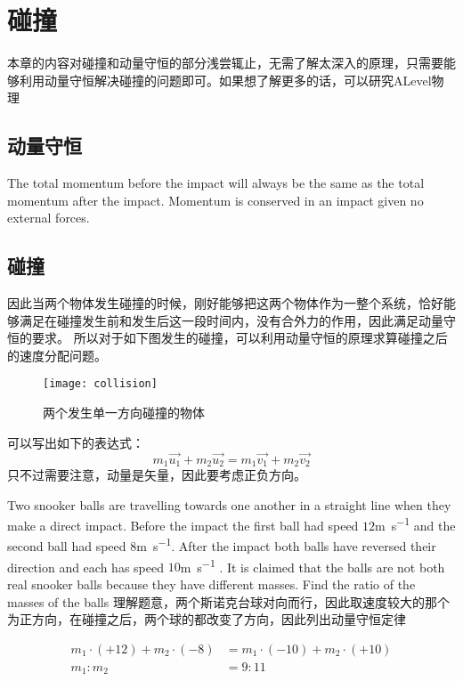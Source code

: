 \clearpage


\section{碰撞}
\label{sec:Collision}
本章的内容对碰撞和动量守恒的部分浅尝辄止，无需了解太深入的原理，只需要能够利用动量守恒解决碰撞的问题即可。如果想了解更多的话，可以研究ALevel物理

\subsection*{动量守恒}
\begin{theorem}
The total momentum before the impact will always be the same as the total momentum after the impact. Momentum is conserved in an impact given no external forces.
\end{theorem}

\subsection*{碰撞}
因此当两个物体发生碰撞的时候，刚好能够把这两个物体作为一整个系统，恰好能够满足在碰撞发生前和发生后这一段时间内，没有合外力的作用，因此满足动量守恒的要求。
所以对于如下图发生的碰撞，可以利用动量守恒的原理求算碰撞之后的速度分配问题。
\begin{figure}[H]
\centering
\texttt{[image: collision]}
\caption{两个发生单一方向碰撞的物体}
\end{figure}

可以写出如下的表达式：
\[
	m_1\overrightarrow{u_1} +m_2\overrightarrow{u_2} =m_1\overrightarrow{v_1} +m_2\overrightarrow{v_2} 
\]
只不过需要注意，动量是矢量，因此要考虑正负方向。


\begin{ExampleBox}
Two snooker balls are travelling towards one another in a straight line when they make a direct impact. Before the impact the first ball had speed $12$\si{\m\per\s} and the second ball had speed $8$\si{\m\per\s}. After the impact both balls have reversed their direction and each has speed $10$\si{\m\per\s} . It is claimed that the balls are not both real snooker balls because they have different masses. Find the ratio of the masses of the balls
\tcblower
理解题意，两个斯诺克台球对向而行，因此取速度较大的那个为正方向，在碰撞之后，两个球的都改变了方向，因此列出动量守恒定律

\begin{align*}
m_1\cdot (+12) + m_2\cdot (-8) &= m_1\cdot (-10) +m_2\cdot (+10)\\
m_1:m_2 &= 9:11
\end{align*}

\end{ExampleBox}
